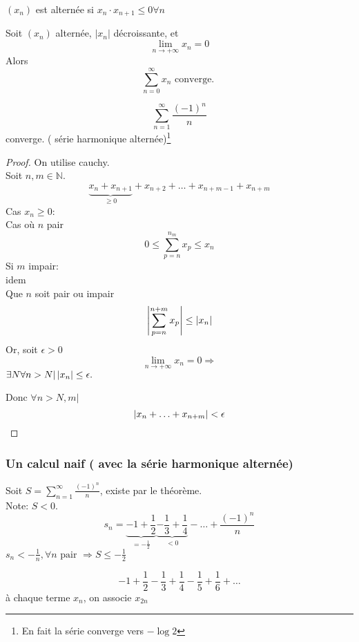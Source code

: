 \documentclass[../main.tex]{subfiles}
\begin{document}
\begin{defn}
	$(x_n)$ est alternée si $x_n \cdot x_{n+1} \leq 0 \forall n$
\end{defn}
\begin{thm}
	Soit $(x_n)$ alternée, $|x_n|$ décroissante, et
	\[ 
	\lim_{n \to  + \infty} x_n =0
	\]
	Alors
	\[ 
	\sum_{n=0}^{ \infty} x_n \text{ converge. } 
	\]
	
\end{thm}
\begin{exemple}
\[ 
	\sum_{n=1}^{ \infty} \frac{(-1)^{n}}{n}
\]
converge. ( série harmonique alternée)\footnote{En fait la série converge vers $- \log 2$}
\end{exemple}
\begin{proof}
On utilise cauchy.\\
Soit $n,m \in \mathbb{N}$.
\[ 
\underbrace{x_n + x_{n+1}}_{\geq 0} + x_{n+2} + \ldots + x_{n+m-1} + x_{n+m} 
\]
Cas $x_n \geq 0$:\\
Cas où $n$ pair
\[ 
0 \leq \sum_{p=n}^{ n_m}x_p \leq x_n
\]
Si $m$ impair:\\
idem\\
Que $n$ soit pair ou impair
\[ 
	\left\vert \sum_{p=n}^{ n+m}x_p\right\vert \leq |x_n|
\]
Or, soit $\epsilon > 0$ 
\[ 
\lim_{n \to  + \infty} x_n = 0 \Rightarrow 
\]
$\exists N \forall n > N| \left\vert x_n\right\vert \leq \epsilon.$

Donc $\forall n > N, m |$ 
\[ 
	\left\vert x_{n} + \ldots + x_{n+m} \right\vert < \epsilon
\]
\end{proof}
\subsubsection{Un calcul naif ( avec la série harmonique alternée)}
Soit $S= \sum_{n=1}^{ \infty} \frac{(-1)^{n}}{n}$, existe par le théorème.\\
Note: $S < 0.$\\
 \[ 
	 s_n = \underbrace{-1 + \frac{1}{2}}_{= -\frac{1}{2}} \underbrace{-\frac{1}{3} + \frac{1}{4} }_{< 0}- \ldots + \frac{(-1)^{n}}{n}
\]
$s_n < -\frac{1}{n}, \forall n \text{ pair }  \Rightarrow S \leq -\frac{1}{2}$

\[ 
-1 + \frac{1}{2} - \frac{1}{3} + \frac{1}{4} - \frac{1}{5} + \frac{1}{6} + \ldots
\]
à chaque terme $x_n$, on associe $x_{ 2n }$
\end{document}
